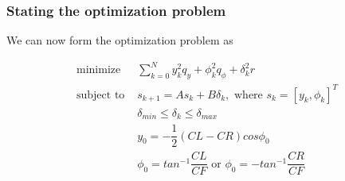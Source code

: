 \subsubsection{Stating the optimization problem}

We can now form the optimization problem as

\begin{align}
  \text{minimize }    & \sum\limits_{k=0}^N y_k^2 q_y + \phi_k^2 q_{\phi} + \delta_k^2 r \\
  \text{subject to }  & s_{k+1} = A s_k + B \delta_k,\text{ where } s_k = [y_k, \phi_k]^T \\
                      & \delta_{min} \leq \delta_k \leq \delta_{max} \\
                      & y_0 = -\dfrac{1}{2}(CL-CR)cos\phi_0 \\
                      & \phi_0 = tan^{-1}\dfrac{CL}{CF} \text{ or } \phi_0 = -tan^{-1}\dfrac{CR}{CF}
\end{align}


